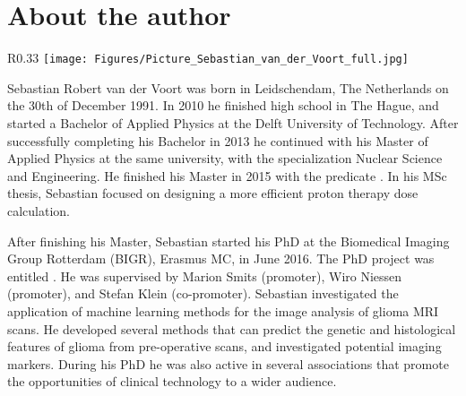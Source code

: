 \chapter{About the author}

\begin{wrapfigure}{R}{0.33\textwidth}
    \centering
    \texttt{[image: Figures/Picture\_Sebastian\_van\_der\_Voort\_full.jpg]}
\end{wrapfigure}


Sebastian Robert van der Voort was born in Leidschendam, The Netherlands on the 30th of December 1991.
In 2010 he finished high school in The Hague, and started a Bachelor of Applied Physics at the Delft University of Technology.
After successfully completing his Bachelor in 2013 he continued with his Master of Applied Physics at the same university, with the specialization Nuclear Science and Engineering.
He finished his Master in 2015 with the predicate .
In his MSc thesis, Sebastian focused on designing a more efficient proton therapy dose calculation.

\vspace{\baselineskip}
\noindent After finishing his Master, Sebastian started his PhD at the Biomedical Imaging Group Rotterdam (BIGR), Erasmus MC, in June 2016.
The PhD project was entitled .
He was supervised by Marion Smits (promoter), Wiro Niessen (promoter), and Stefan Klein (co-promoter).
Sebastian investigated the application of machine learning methods for the image analysis of glioma MRI scans.
He developed several methods that can predict the genetic and histological features of glioma from pre-operative scans, and investigated potential imaging markers.
During his PhD he was also active in several associations that promote the opportunities of clinical technology to a wider audience.
